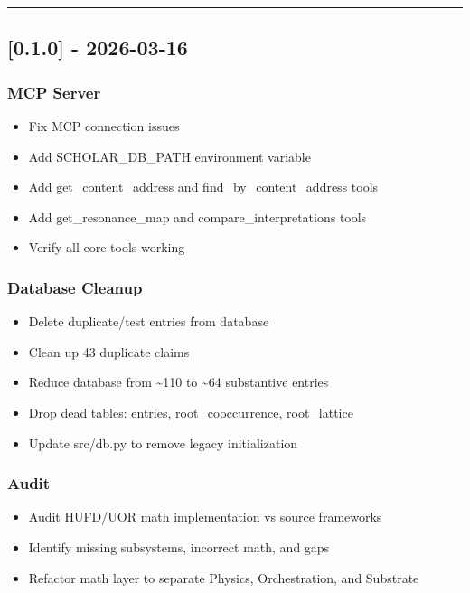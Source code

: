 \documentclass[12pt,a4paper]{article}
\providecommand{\tightlist}{\setlength{\itemsep}{0pt}\setlength{\parskip}{0pt}}
\begin{document}
\begin{center}\rule{0.5\linewidth}{0.5pt}\end{center}

\subsection{{[}0.1.0{]} - 2026-03-16}\label{section}

\subsubsection{MCP Server}\label{mcp-server}

\begin{itemize}
\tightlist
\item
  Fix MCP connection issues
\item
  Add SCHOLAR\_DB\_PATH environment variable
\item
  Add get\_content\_address and find\_by\_content\_address tools
\item
  Add get\_resonance\_map and compare\_interpretations tools
\item
  Verify all core tools working
\end{itemize}

\subsubsection{Database Cleanup}\label{database-cleanup}

\begin{itemize}
\tightlist
\item
  Delete duplicate/test entries from database
\item
  Clean up 43 duplicate claims
\item
  Reduce database from \textasciitilde110 to \textasciitilde64
  substantive entries
\item
  Drop dead tables: entries, root\_cooccurrence, root\_lattice
\item
  Update src/db.py to remove legacy initialization
\end{itemize}

\subsubsection{Audit}\label{audit}

\begin{itemize}
\tightlist
\item
  Audit HUFD/UOR math implementation vs source frameworks
\item
  Identify missing subsystems, incorrect math, and gaps
\item
  Refactor math layer to separate Physics, Orchestration, and Substrate
\end{itemize}
\end{document}
